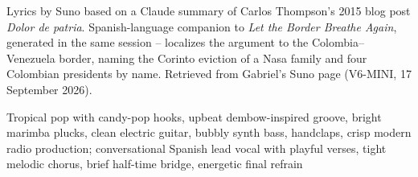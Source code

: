 
\begin{notes}
Lyrics by Suno based on a Claude summary of Carlos Thompson's 2015 blog post \emph{Dolor de patria}. Spanish-language companion to \emph{Let the Border Breathe Again}, generated in the same session -- localizes the argument to the Colombia--Venezuela border, naming the Corinto eviction of a Nasa family and four Colombian presidents by name. Retrieved from Gabriel's Suno page (V6-MINI, 17 September 2026).
\end{notes}
\begin{style}
Tropical pop with candy-pop hooks, upbeat dembow-inspired groove, bright marimba plucks, clean electric guitar, bubbly synth bass, handclaps, crisp modern radio production; conversational Spanish lead vocal with playful verses, tight melodic chorus, brief half-time bridge, energetic final refrain
\end{style}
